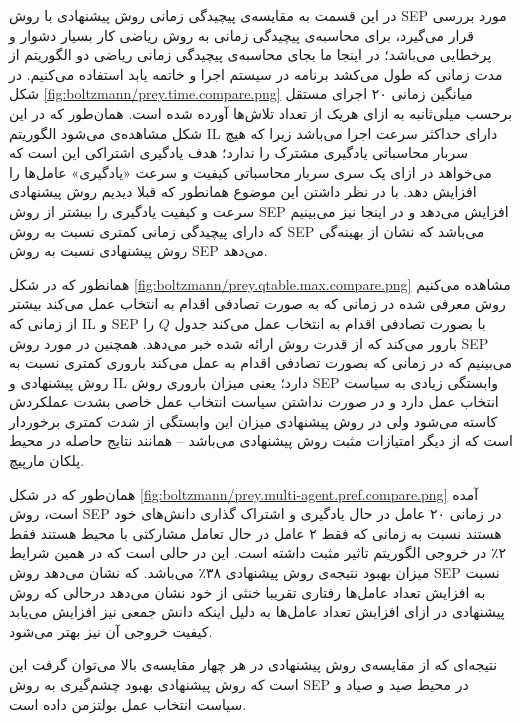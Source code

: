  در این قسمت به مقایسه‌‌ی پیچیدگی زمانی روش پیشنهادی با روش SEP مورد بررسی قرار می‌گیرد، برای محاسبه‌ی پیچیدگی زمانی به روش ریاضی کار بسیار دشوار و پرخطایی می‌باشد؛ در اینجا ما بجای محاسبه‌ی پیچیدگی زمانی ریاضی دو الگوریتم از مدت زمانی که طول می‌کشد برنامه در سیستم اجرا و خاتمه یابد استفاده می‌کنیم. در شکل
\ref{fig:boltzmann/prey.time.compare.png}
میانگین زمانی ۲۰ اجرای مستقل برحسب میلی‌ثانبه به ازای هریک از تعداد تلاش‌ها آورده شده است. همان‌طور که در این شکل مشاهده‌ی می‌شود الگوریتم IL دارای حداکثر سرعت اجرا می‌باشد زیرا که هیچ سربار محاسباتی یادگیری مشترک را ندارد؛ هدف یادگیری اشتراکی این است که می‌خواهد در ازای یک سری سربار محاسباتی کیفیت و سرعت «یادگیری» عامل‌ها را افزایش دهد. با در نظر داشتن این موضوع همانطور که قبلا دیدیم روش پیشنهادی سرعت و کیفیت یادگیری را بیشتر از روش SEP افزایش می‌دهد و در اینجا نیز می‌بینیم که دارای پیچیدگی زمانی کمتری نسبت به روش SEP می‌باشد که نشان از بهینه‌گی روش پیشنهادی نسبت به روش SEP می‌دهد.


 همانطور که در شکل
\ref{fig:boltzmann/prey.qtable.max.compare.png}
مشاهده می‌کنیم روش معرفی شده در زمانی که به صورت تصادفی اقدام به انتخاب عمل می‌کند بیشتر از زمانی که IL و SEP با بصورت تصادفی اقدام به انتخاب عمل می‌کند جدول $Q$ را بارور می‌کند که از قدرت روش ارائه شده خبر می‌دهد. همچنین در مورد روش SEP می‌بینیم که در زمانی که بصورت تصادفی اقدام به عمل می‌کند باروری کمتری نسبت به روش پیشنهادی و IL دارد؛ یعنی میزان باروری روش SEP وابستگی زیادی به سیاست انتخاب عمل دارد و در صورت نداشتن سیاست انتخاب عمل خاصی بشدت عملکردش کاسته می‌شود ولی در روش پیشنهادی میزان این وابستگی از شدت کمتری برخوردار است که از دیگر امتیازات مثبت روش پیشنهادی می‌باشد -- همانند نتایج حاصله در محیط پلکان مارپیچ.



همان‌طور که در شکل
\ref{fig:boltzmann/prey.multi-agent.pref.compare.png}
آمده است، روش SEP در زمانی ۲۰ عامل در حال یادگیری و اشتراک گذاری دانش‌های خود هستند نسبت به زمانی که فقط ۲ عامل در حال تعامل مشارکتی با محیط هستند فقط ۲٪ در خروجی الگوریتم تاثیر مثبت داشته است. این در حالی است که در همین شرایط میزان بهبود نتیجه‌ی روش پیشنهادی ۳۸٪ می‌باشد. که نشان می‌دهد روش SEP نسبت به افزایش تعداد عامل‌ها رفتاری تقریبا خنثی از خود نشان می‌دهد درحالی که روش پیشنهادی در ازای افزایش تعداد عامل‌ها به دلیل اینکه دانش جمعی نیز افزایش می‌یابد کیفیت خروجی آن نیز بهتر می‌شود.


 نتیجه‌ای که از مقایسه‌ی روش پیشنهادی در هر چهار مقایسه‌ی بالا می‌توان گرفت این است که روش پیشنهادی بهبود چشم‌گیری به روش SEP در محیط صید و صیاد و سیاست انتخاب عمل بولتزمن داده است.